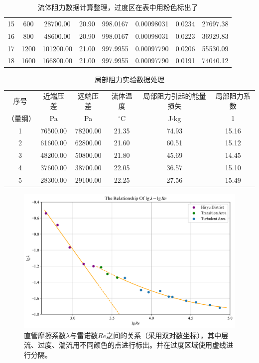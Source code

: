 \documentclass[UTF8,AutoFakeBold,a4paper]{article}
\begin{document}
\begin{table}[h]
\begin{tabular}{cccccccc}
        15 & 600 & 28700.00 & 20.90 & 998.0167 & 0.00098031 & 0.0234 & 27697.38 \\ 
        16 & 800 & 48600.00 & 20.90 & 998.0167 & 0.00098031 & 0.0223 & 36929.83 \\ 
        17 & 1200 & 101200.00 & 21.00 & 997.9955 & 0.00097790 & 0.0206 & 55530.09 \\ 
        18 & 1600 & 166800.00 & 21.00 & 997.9955 & 0.00097790 & 0.0191 & 74040.12 \\ 
        \bottomrule
		\end{tabular}	
		\label{ta1}
		\caption{流体阻力数据计算整理，过度区在表中用\textcolor{mypink}{粉色}标出了}
\end{table}

\begin{table}[h]
		\centering
		\begin{tabular}{cccccc}
		\toprule
		
 序号 & 近端压差 & 远端压差 & 流体温度 & 局部阻力引起的能量损失 & 局部阻力系数 \\ 
  （量纲）&Pa&Pa&$^{\circ}$C&J$\cdot$kg&1\\
 \midrule
		1 & 76500.00 & 78200.00 & 21.35 & 74.93 & 15.16 \\ 
        2 & 61600.00 & 62800.00 & 21.60 & 60.51 & 15.12 \\ 
        3 & 48200.00 & 50800.00 & 21.80 & 45.69 & 14.45 \\ 
        4 & 37600.00 & 38700.00 & 22.05 & 36.57 & 15.10 \\ 
        5 & 28300.00 & 29100.00 & 22.25 & 27.56 & 15.49 \\ 
        \bottomrule
		\end{tabular}	
		\label{ta1}
		\caption{局部阻力实验数据处理}
\end{table}



\newpage


\begin{figure}[h]
	\centering
	\includegraphics[scale=0.5]{流体阻力1}
	\caption{直管摩擦系数$\lambda$与雷诺数$Re$之间的关系（采用双对数坐标），其中层流、过度、湍流用不同颜色的点进行标出。并在过度区域使用虚线进行分隔。}
\end{figure}
\end{document}
